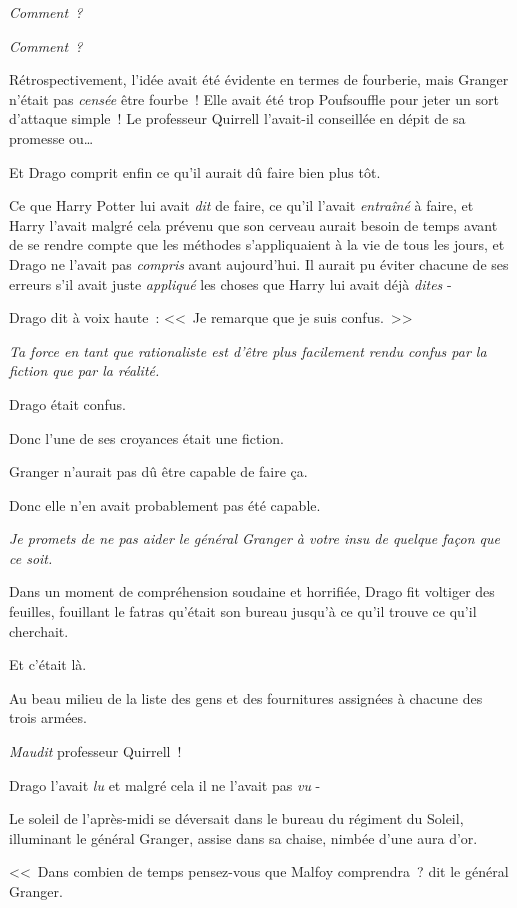 \emph{Comment~?}

\emph{Comment~?}

Rétrospectivement, l'idée avait été évidente en termes de fourberie, mais Granger n'était pas \emph{censée} être fourbe~! Elle avait été trop Poufsouffle pour jeter un sort d'attaque simple~! Le professeur Quirrell l'avait-il conseillée en dépit de sa promesse ou…

Et Drago comprit enfin ce qu'il aurait dû faire bien plus tôt.

Ce que Harry Potter lui avait \emph{dit} de faire, ce qu'il l'avait \emph{entraîné} à faire, et Harry l'avait malgré cela prévenu que son cerveau aurait besoin de temps avant de se rendre compte que les méthodes s'appliquaient à la vie de tous les jours, et Drago ne l'avait pas \emph{compris} avant aujourd'hui. Il aurait pu éviter chacune de ses erreurs s'il avait juste \emph{appliqué} les choses que Harry lui avait déjà \emph{dites} -

Drago dit à voix haute~: <<~Je remarque que je suis confus.~>>

\emph{Ta force en tant que rationaliste est d'être plus facilement rendu confus par la fiction que par la réalité.}

Drago était confus.

Donc l'une de ses croyances était une fiction.

Granger n'aurait pas dû être capable de faire ça.

Donc elle n'en avait probablement pas été capable.

\emph{Je promets de ne pas aider le général Granger à votre insu de quelque façon que ce soit.}

Dans un moment de compréhension soudaine et horrifiée, Drago fit voltiger des feuilles, fouillant le fatras qu'était son bureau jusqu'à ce qu'il trouve ce qu'il cherchait.

Et c'était là.

Au beau milieu de la liste des gens et des fournitures assignées à chacune des trois armées.

\emph{Maudit} professeur Quirrell~!

Drago l'avait \emph{lu} et malgré cela il ne l'avait pas \emph{vu} -

\later

Le soleil de l'après-midi se déversait dans le bureau du régiment du Soleil, illuminant le général Granger, assise dans sa chaise, nimbée d'une aura d'or.

<<~Dans combien de temps pensez-vous que Malfoy comprendra~? dit le général Granger.


